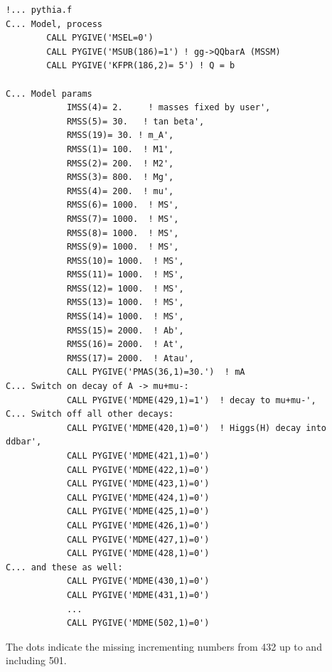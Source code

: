 \documentclass[12pt,A4paper]{article}
\begin{document}
\begin{lstlisting}
!... pythia.f
C... Model, process
        CALL PYGIVE('MSEL=0')
        CALL PYGIVE('MSUB(186)=1') ! gg->QQbarA (MSSM)
        CALL PYGIVE('KFPR(186,2)= 5') ! Q = b

C... Model params
            IMSS(4)= 2.     ! masses fixed by user',
            RMSS(5)= 30.   ! tan beta',
            RMSS(19)= 30. ! m_A',
            RMSS(1)= 100.  ! M1',
            RMSS(2)= 200.  ! M2',
            RMSS(3)= 800.  ! Mg',
            RMSS(4)= 200.  ! mu',
            RMSS(6)= 1000.  ! MS',
            RMSS(7)= 1000.  ! MS',
            RMSS(8)= 1000.  ! MS',
            RMSS(9)= 1000.  ! MS',
            RMSS(10)= 1000.  ! MS',
            RMSS(11)= 1000.  ! MS',
            RMSS(12)= 1000.  ! MS',
            RMSS(13)= 1000.  ! MS',
            RMSS(14)= 1000.  ! MS',
            RMSS(15)= 2000.  ! Ab',
            RMSS(16)= 2000.  ! At',
            RMSS(17)= 2000.  ! Atau',
            CALL PYGIVE('PMAS(36,1)=30.')  ! mA
C... Switch on decay of A -> mu+mu-:
            CALL PYGIVE('MDME(429,1)=1')  ! decay to mu+mu-',
C... Switch off all other decays:
            CALL PYGIVE('MDME(420,1)=0')  ! Higgs(H) decay into ddbar',
            CALL PYGIVE('MDME(421,1)=0')
            CALL PYGIVE('MDME(422,1)=0')
            CALL PYGIVE('MDME(423,1)=0')
            CALL PYGIVE('MDME(424,1)=0')
            CALL PYGIVE('MDME(425,1)=0')
            CALL PYGIVE('MDME(426,1)=0')
            CALL PYGIVE('MDME(427,1)=0')
            CALL PYGIVE('MDME(428,1)=0')
C... and these as well:
            CALL PYGIVE('MDME(430,1)=0')
            CALL PYGIVE('MDME(431,1)=0')
            ...
            CALL PYGIVE('MDME(502,1)=0')
\end{lstlisting}
The dots indicate the missing incrementing numbers from 432 up to and including 501.

\clearpage
\end{document}
